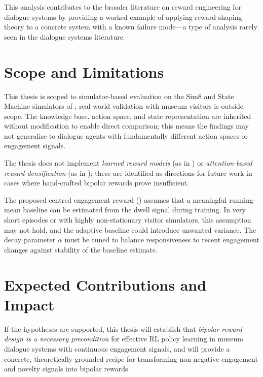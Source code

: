\documentclass[12pt,a4paper]{article}
\begin{document}
This analysis contributes to the broader literature on reward engineering for dialogue systems by providing a worked example of applying reward-shaping theory to a concrete system with a known failure mode---a type of analysis rarely seen in the dialogue systems literature.

\section{Scope and Limitations}
\label{sec:scope}

This thesis is scoped to simulator-based evaluation on the Sim8 and State Machine simulators of \citet{bourdon2025}; real-world validation with museum visitors is outside scope. The knowledge base, action space, and state representation are inherited without modification to enable direct comparison; this means the findings may not generalise to dialogue agents with fundamentally different action spaces or engagement signals.

The thesis does not implement \emph{learned reward models} (as in \citealt{su2016}) or \emph{attention-based reward densification} (as in \citealt{holmes2025}); these are identified as directions for future work in cases where hand-crafted bipolar rewards prove insufficient.

The proposed centred engagement reward () assumes that a meaningful running-mean baseline can be estimated from the dwell signal during training. In very short episodes or with highly non-stationary visitor simulators, this assumption may not hold, and the adaptive baseline could introduce unwanted variance. The decay parameter $\alpha$ must be tuned to balance responsiveness to recent engagement changes against stability of the baseline estimate.

\section{Expected Contributions and Impact}
\label{sec:impact}

If the hypotheses are supported, this thesis will establish that \emph{bipolar reward design is a necessary precondition} for effective RL policy learning in museum dialogue systems with continuous engagement signals, and will provide a concrete, theoretically grounded recipe for transforming non-negative engagement and novelty signals into bipolar rewards.
\end{document}
